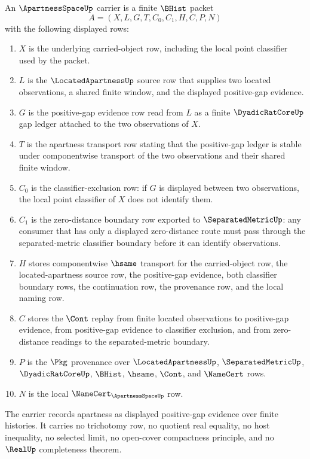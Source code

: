 \begin{definition}
\label{def:apartness-space-carrier}
An $\ApartnessSpaceUp$ carrier is a finite $\BHist$ packet
$$
A=(X,L,G,T,C_0,C_1,H,C,P,N)
$$
with the following displayed rows:
\begin{enumerate}
\item $X$ is the underlying carried-object row, including the local point
classifier used by the packet.
\item $L$ is the $\LocatedApartnessUp$ source row that supplies two located
observations, a shared finite window, and the displayed positive-gap evidence.
\item $G$ is the positive-gap evidence row read from $L$ as a finite
$\DyadicRatCoreUp$ gap ledger attached to the two observations of $X$.
\item $T$ is the apartness transport row stating that the positive-gap ledger
is stable under componentwise transport of the two observations and their
shared finite window.
\item $C_0$ is the classifier-exclusion row: if $G$ is displayed between two
observations, the local point classifier of $X$ does not identify them.
\item $C_1$ is the zero-distance boundary row exported to
$\SeparatedMetricUp$: any consumer that has only a displayed zero-distance
route must pass through the separated-metric classifier boundary before it can
identify observations.
\item $H$ stores componentwise $\hsame$ transport for the carried-object row,
the located-apartness source row, the positive-gap evidence, both classifier
boundary rows, the continuation row, the provenance row, and the local naming
row.
\item $C$ stores the $\Cont$ replay from finite located observations to
positive-gap evidence, from positive-gap evidence to classifier exclusion, and
from zero-distance readings to the separated-metric boundary.
\item $P$ is the $\Pkg$ provenance over $\LocatedApartnessUp$,
$\SeparatedMetricUp$, $\DyadicRatCoreUp$, $\BHist$, $\hsame$, $\Cont$, and
$\NameCert$ rows.
\item $N$ is the local $\NameCert_{\ApartnessSpaceUp}$ row.
\end{enumerate}
The carrier records apartness as displayed positive-gap evidence over finite
histories. It carries no trichotomy row, no quotient real equality, no host
inequality, no selected limit, no open-cover compactness principle, and no
$\RealUp$ completeness theorem.
\end{definition}

